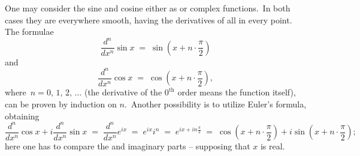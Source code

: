 \documentclass[12pt]{article}
\begin{document}

One may consider the sine and cosine either as  or complex functions.\, In both  cases they are everywhere smooth, having the derivatives of all  in every point.\, The formulae
$$\frac{d^n}{dx^n}\sin{x} \;=\; \sin{(x+n\!\cdot\!\frac{\pi}{2})}$$
and
$$\frac{d^n}{dx^n}\cos{x} \;=\; \cos{(x+n\!\cdot\!\frac{\pi}{2})},$$
where\, $n = 0,\,1,\,2,\,\ldots$ (the derivative of the $0^\mathrm{th}$ order means the function itself), can be proven by induction on $n$.\, Another possibility is to utilize Euler's formula, obtaining
$$\frac{d^n}{dx^n}\cos{x}+i\frac{d^n}{dx^n}\sin{x} \;=\; \frac{d^n}{dx^n}e^{ix} \;=\; 
e^{ix}i^n \;=\; e^{ix+in\frac{\pi}{2}} \;=\; 
\cos{(x+n\!\cdot\!\frac{\pi}{2})}+i\sin{(x+n\!\cdot\!\frac{\pi}{2})};$$
here one has to compare the  and imaginary parts -- supposing that $x$ is real.
\end{document}
